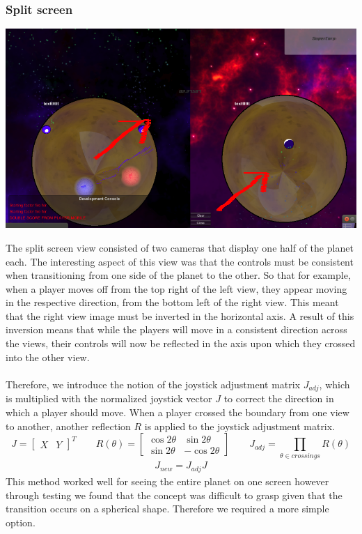 \documentclass[11pt,a4paper]{article}
\begin{document}
   \subsubsection{Split screen} 
   \begin{center}
   \includegraphics[scale=0.2]{logos/split.png}
   \end{center}
   
   The split screen view consisted of two cameras that display one half of the planet each. The interesting aspect of this view was that the controls must be consistent when transitioning from one side of the planet to the other. So that for example, when a player moves off from the top right of the left view, they appear moving in the respective direction, from the bottom left of the right view. This meant that the right view image must be inverted in the horizontal axis. A result of this inversion means that while the players will move in a consistent direction across the views, their controls will now be reflected in the axis upon which they crossed into the other view. \\ \\
   Therefore, we introduce the notion of the joystick adjustment matrix $J_{adj}$, which is multiplied with the normalized joystick vector $J$ to correct the direction in which a player should move. When a player crossed the boundary from one view to another, another reflection $R$ is applied to the joystick adjustment matrix. 
  \begin{equation}
     J=\begin{bmatrix}
         X & Y
        \end{bmatrix}^{T}
        \qquad
          R(\theta) = 
          \begin{bmatrix}
          \cos {2\theta} & \sin {2\theta} \\
          \sin {2\theta} & -\cos {2\theta}
          \end{bmatrix}
      \qquad
      J_{adj} = \prod_{\theta \in crossings}R({\theta})
  \end{equation}
  \begin{align*}
    J_{new} = J_{adj}J
  \end{align*}
  This method worked well for seeing the entire planet on one screen however through testing we found that the concept was difficult to grasp given that the transition occurs on a spherical shape. Therefore we required a more simple option.
\end{document}

